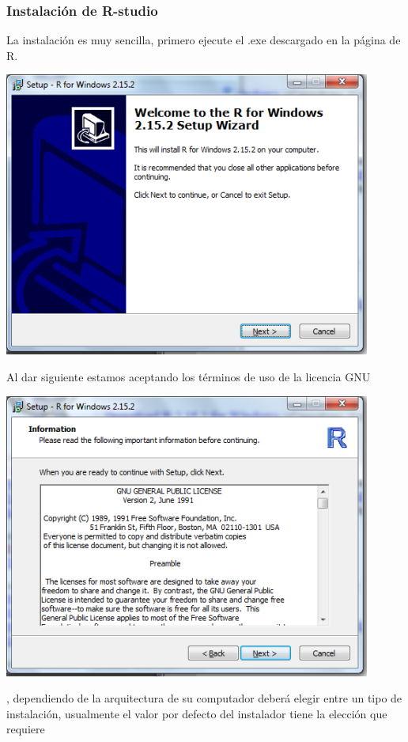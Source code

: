 \documentclass[12pt,hidelinks]{article}
\begin{document}
	\subsubsection{Instalación de R-studio}
	La instalación es muy sencilla, primero ejecute el .exe descargado en la página de R.
	\begin{center}
		\includegraphics[scale=0.9]{images/1/install3-1.png}
	\end{center}
	Al dar siguiente estamos aceptando los términos de uso de la licencia GNU
	\begin{center}
		\includegraphics[scale=0.9]{images/1/install3-2.png}
	\end{center}
	, dependiendo de la arquitectura de su computador deberá elegir entre un tipo de instalación, usualmente el valor por defecto del instalador tiene la elección que requiere
\end{document}
